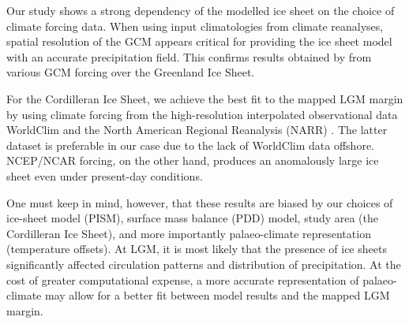 \conclusions
\label{sec:concl}

Our study shows a strong dependency of the modelled ice sheet on the choice of climate forcing data. When using input climatologies from climate reanalyses, spatial resolution of the GCM appears critical for providing the ice sheet model with an accurate precipitation field. This confirms results obtained by \citet{quiquet-etal-2012} from various GCM forcing over the Greenland Ice Sheet.

For the Cordilleran Ice Sheet, we achieve the best fit to the mapped LGM margin by \citet{dyke-2004} using climate forcing from the high-resolution interpolated observational data WorldClim \citep{data:worldclim} and the North American Regional Reanalysis (NARR) \citep{data:narr}. The latter dataset is preferable in our case due to the lack of WorldClim data offshore. NCEP/NCAR forcing, on the other hand, produces an anomalously large ice sheet even under present-day conditions.

One must keep in mind, however, that these results are biased by our choices of ice-sheet model (PISM), surface mass balance (PDD) model, study area (the Cordilleran Ice Sheet), and more importantly palaeo-climate representation (temperature offsets). At LGM, it is most likely that the presence of ice sheets significantly affected circulation patterns and distribution of precipitation. At the cost of greater computational expense, a more accurate representation of palaeo-climate may allow for a better fit between model results and the mapped LGM margin.
